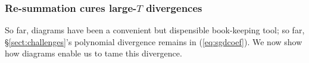 {            %





            \subsubsection{Re-summation cures large-$T$ divergences}\label{sect:resummation}
            So far, diagrams have been a convenient but dispensible
            book-keeping tool; so far, \S\ref{sect:challenges}'s polynomial
            divergence remains in (\ref{eq:sgdcoef}).  We now show how
            diagrams enable us to tame this divergence.

}
